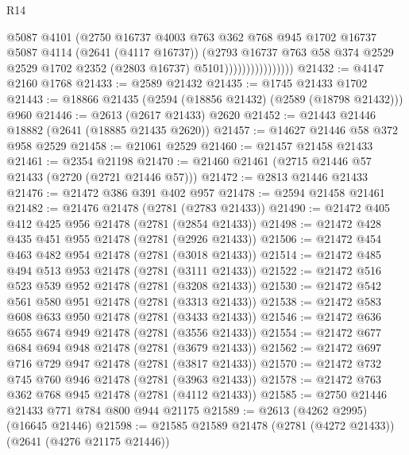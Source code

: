 \begin{lexlean}{R14}
\begin{coremodule}
                                @5087
                                @4101
                                (@2750
                                  @16737
                                  @4003
                                  @763
                                  @362
                                  @768
                                  @945
                                  @1702
                                  @16737
                                  @5087
                                  @4114
                                  (@2641 (@4117 @16737))
                                  (@2793
                                    @16737
                                    @763
                                    @58
                                    @374
                                    @2529
                                    @2529
                                    @1702
                                    @2352
                                    (@2803 @16737)
                                    @5101))))))))))))))))
@21432 := @4147 @2160 @1768
@21433 := @2589 @21432
@21435 := @1745 @21433 @1702
@21443 := @18866 @21435 (@2594 (@18856 @21432) (@2589 (@18798 @21432))) @960
@21446 := @2613 (@2617 @21433) @2620
@21452 := @21443 @21446 @18882 (@2641 (@18885 @21435 @2620))
@21457 := @14627 @21446 @58 @372 @958 @2529
@21458 := @21061 @2529
@21460 := @21457 @21458 @21433
@21461 := @2354 @21198
@21470 := @21460 @21461 (@2715 @21446 @57 @21433 (@2720 (@2721 @21446 @57)))
@21472 := @2813 @21446 @21433
@21476 := @21472 @386 @391 @402 @957
@21478 := @2594 @21458 @21461
@21482 := @21476 @21478 (@2781 (@2783 @21433))
@21490 := @21472 @405 @412 @425 @956 @21478 (@2781 (@2854 @21433))
@21498 := @21472 @428 @435 @451 @955 @21478 (@2781 (@2926 @21433))
@21506 := @21472 @454 @463 @482 @954 @21478 (@2781 (@3018 @21433))
@21514 := @21472 @485 @494 @513 @953 @21478 (@2781 (@3111 @21433))
@21522 := @21472 @516 @523 @539 @952 @21478 (@2781 (@3208 @21433))
@21530 := @21472 @542 @561 @580 @951 @21478 (@2781 (@3313 @21433))
@21538 := @21472 @583 @608 @633 @950 @21478 (@2781 (@3433 @21433))
@21546 := @21472 @636 @655 @674 @949 @21478 (@2781 (@3556 @21433))
@21554 := @21472 @677 @684 @694 @948 @21478 (@2781 (@3679 @21433))
@21562 := @21472 @697 @716 @729 @947 @21478 (@2781 (@3817 @21433))
@21570 := @21472 @732 @745 @760 @946 @21478 (@2781 (@3963 @21433))
@21578 := @21472 @763 @362 @768 @945 @21478 (@2781 (@4112 @21433))
@21585 := @2750 @21446 @21433 @771 @784 @800 @944 @21175
@21589 := @2613 (@4262 @2995) (@16645 @21446)
@21598 := @21585 @21589 @21478 (@2781 (@4272 @21433)) (@2641 (@4276 @21175 @21446))

\end{coremodule}
\end{lexlean}
